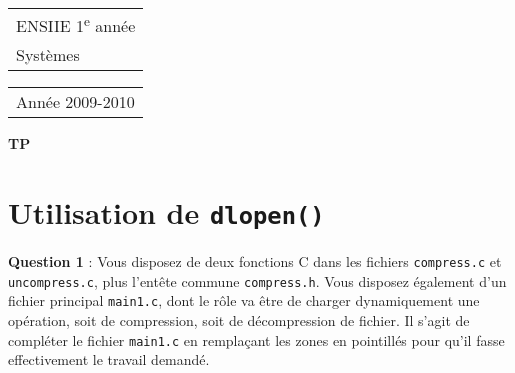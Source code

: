 \documentclass[a4paper,12pt]{article}
\begin{document}
{\large\sffamily
\begin{tabular}[t]{l}
  ENSIIE 1\textsuperscript{e} année\\
  Systèmes
\end{tabular}%
\hfill%
\begin{tabular}[t]{r}
  Année 2009-2010
\end{tabular}}

\vspace{2em}
\begin{center}
  \Large\bfseries\sffamily TP 
\end{center}
\vspace{1em}


\section{Utilisation de \texttt{dlopen()}}

\textbf{Question 1} : Vous disposez de deux fonctions C dans les fichiers \texttt{compress.c}
et \texttt{uncompress.c}, plus l'entête commune \texttt{compress.h}.
Vous disposez également d'un fichier principal \texttt{main1.c}, dont le rôle va être 
de charger dynamiquement une opération, soit de compression, soit de décompression de fichier.
Il s'agit de compléter le fichier \texttt{main1.c} en remplaçant les zones en pointillés 
pour qu'il fasse effectivement le travail demandé.
\end{document}

